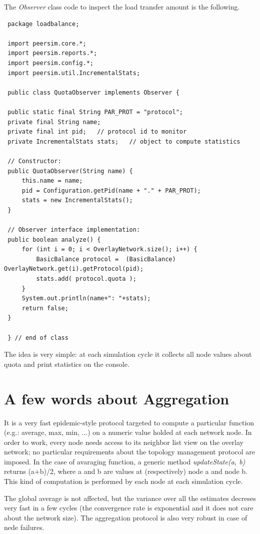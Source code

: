 \documentclass[a4paper,11pt]{article}
\begin{document}
The \emph{Observer} class code to inspect the load transfer amount
is the following. \\

\footnotesize
\begin{verbatim}
 package loadbalance;
 
 import peersim.core.*;
 import peersim.reports.*;
 import peersim.config.*;
 import peersim.util.IncrementalStats;
 
 public class QuotaObserver implements Observer {
 
 public static final String PAR_PROT = "protocol";
 private final String name;   
 private final int pid;   // protocol id to monitor
 private IncrementalStats stats;   // object to compute statistics
 
 // Constructor:
 public QuotaObserver(String name) {
     this.name = name;
     pid = Configuration.getPid(name + "." + PAR_PROT);
     stats = new IncrementalStats();
 }
 
 // Observer interface implementation:
 public boolean analyze() {
     for (int i = 0; i < OverlayNetwork.size(); i++) {
         BasicBalance protocol =  (BasicBalance) OverlayNetwork.get(i).getProtocol(pid);
         stats.add( protocol.quota );
     }
     System.out.println(name+": "+stats);
     return false;
 }
 
 } // end of class
\end{verbatim}
\normalsize


The idea is very simple: at each simulation cycle it collects all
node values about quota and print statistics on the console.


\section{\label{sec:Appendix-A-aggregation}A few words about
Aggregation}

It is a very fast epidemic-style protocol targeted to compute a particular
function (e.g.: average, max, min, ...) on a numeric value holded
at each network node. In order to work, every node needs access to
its neighbor list view on the overlay network; no particular requirements
about the topology management protocol are imposed. In the case of
avaraging function, a generic method \emph{updateState(a, b)} returns
(a+b)/2, where a and b are values at (respectively) node a and node
b. This kind of computation is performed by each node at each simulation
cycle.

The global average is not affected, but the variance over all the
estimates decreses very fast in a few cycles (the convergence rate
is exponential and it does not care about the network size). The aggregation
protocol is also very robust in case of nede failures. 
\end{document}
